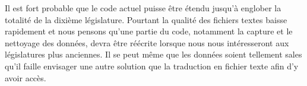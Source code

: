 Il est fort probable que le code actuel puisse être étendu jusqu'à englober la totalité de la dixième législature. Pourtant la qualité des fichiers textes baisse rapidement et nous pensons qu'une partie du code, notamment la capture et le nettoyage des données, devra être réécrite lorsque nous nous intéresseront aux législatures plus anciennes. Il se peut même que les données soient tellement sales qu'il faille envisager une autre solution que la traduction en fichier texte afin d'y avoir accès.
